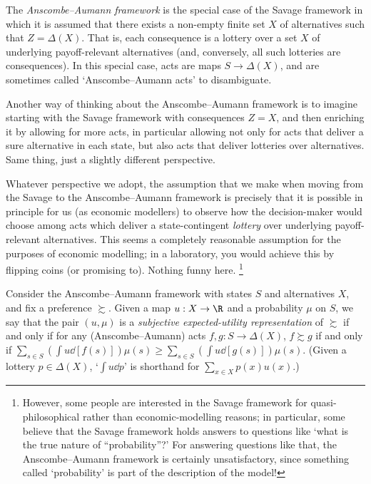The \emph{Anscombe--Aumann framework} \parencite[after][]{AnscombeAumann1963} is the special case of the Savage framework in which it is assumed that there exists a non-empty finite set $X$ of alternatives such that $Z = \Delta(X)$. That is, each consequence is a lottery over a set $X$ of underlying payoff-relevant alternatives (and, conversely, all such lotteries are consequences). In this special case, acts are maps $S \to \Delta(X)$, and are sometimes called `Anscombe--Aumann acts' to disambiguate.

Another way of thinking about the Anscombe--Aumann framework is to imagine starting with the Savage framework with consequences $Z=X$, and then enriching it by allowing for more acts, in particular allowing not only for acts that deliver a sure alternative in each state, but also acts that deliver lotteries over alternatives. Same thing, just a slightly different perspective.

Whatever perspective we adopt, the assumption that we make when moving from the Savage to the Anscombe--Aumann framework is precisely that it is possible in principle for us (as economic modellers) to observe how the decision-maker would choose among acts which deliver a state-contingent \emph{lottery} over underlying payoff-relevant alternatives. This seems a completely reasonable assumption for the purposes of economic modelling; in a laboratory, you would achieve this by flipping coins (or promising to). Nothing funny here.%
	\footnote{However, some people are interested in the Savage framework for quasi-philosophical rather than economic-modelling reasons; in particular, some believe that the Savage framework holds answers to questions like `what is the true nature of ``probability''?' For answering questions like that, the Anscombe--Aumann framework is certainly unsatisfactory, since something called `probability' is part of the description of the model!}

\begin{definition}
	\label{definition:seu_aa}
	Consider the Anscombe--Aumann framework with states $S$ and alternatives $X$, and fix a preference $\succsim$. Given a map $u : X \to \R$ and a probability $\mu$ on $S$, we say that the pair $(u,\mu)$ is a \emph{subjective expected-utility representation} of $\succsim$ if and only if for any (Anscombe--Aumann) acts $f,g : S \to \Delta(X)$, $f \succsim g$ if and only if $\sum_{s \in S} ( \int u \dd [f(s)] ) \mu(s) \geq \sum_{s \in S} ( \int u \dd [g(s)] ) \mu(s)$. (Given a lottery $p \in \Delta(X)$, `$\int u \dd p$' is shorthand for $\sum_{x \in X} p(x) u(x)$.)
\end{definition}

